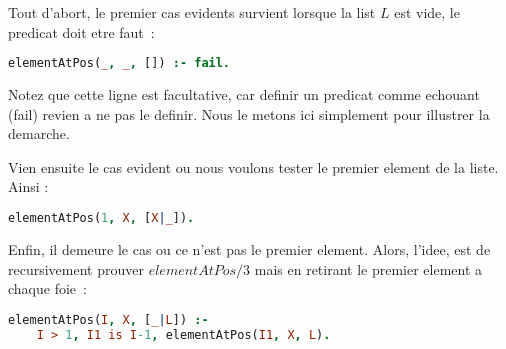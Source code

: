 Tout d'abort, le premier cas evidents survient lorsque la list $L$ est vide, le
predicat doit etre faut~:
\begin{lstlisting}[language=Prolog,frame=single]
elementAtPos(_, _, []) :- fail.
\end{lstlisting}
Notez que cette ligne est facultative, car definir un predicat comme echouant
(fail) revien a ne pas le definir. Nous le metons ici simplement pour
illustrer la demarche.

Vien ensuite le cas evident ou nous voulons tester le premier element de la
liste. Ainsi :
\begin{lstlisting}[language=Prolog,frame=single]
elementAtPos(1, X, [X|_]).
\end{lstlisting}

Enfin, il demeure le cas ou ce n'est pas le premier element. Alors, l'idee, est
de recursivement prouver $elementAtPos/3$ mais en retirant le premier element
a chaque foie~:
\begin{lstlisting}[language=Prolog,frame=single]
elementAtPos(I, X, [_|L]) :-
    I > 1, I1 is I-1, elementAtPos(I1, X, L).
\end{lstlisting}
